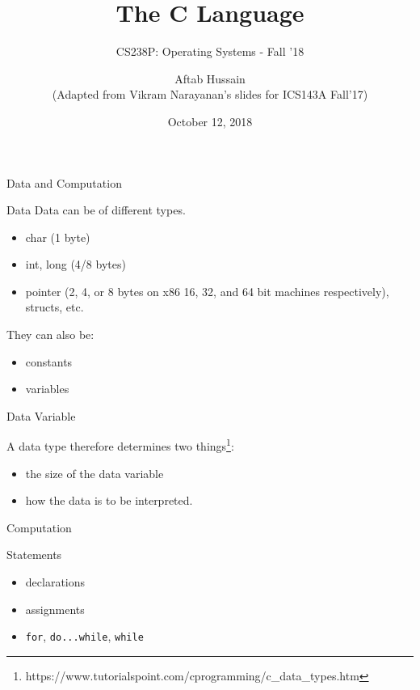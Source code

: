 \documentclass[10pt]{beamer}
\title{The C Language}
\subtitle{CS238P: Operating Systems - Fall '18}
\author{Aftab Hussain\\ (Adapted from Vikram Narayanan's slides for ICS143A Fall'17)}
\date{October 12, 2018}
\institute{University of California, Irvine}
\begin{document}
\maketitle

\begin{frame}[standout]
  Data and Computation
\end{frame}

\begin{frame}{Data}
 Data can be of different types.
\begin{itemize}
\item char (1 byte)
\item int, long (4/8 bytes)
\item pointer (2, 4, or 8 bytes on x86 16, 32, and 64 bit machines respectively), structs, etc.
\end{itemize}
They can also be:
\begin{itemize}
\item constants
\item variables
\end{itemize}
\end{frame}

\begin{frame}{Data Variable}

  A data type therefore determines two things\footnote{https://www.tutorialspoint.com/cprogramming/c\_data\_types.htm}:

 \begin{itemize}
 \item the size of the data variable
 \item how the data is to be interpreted.
 \end{itemize}

 \end{frame}

 \begin{frame}[standout]
  Computation
\end{frame}

\begin{frame}{Statements}
\begin{itemize}
\item declarations
\item assignments
\item \texttt{for}, \texttt{do...while}, \texttt{while}
\end{itemize}
\end{frame}
\end{document}
